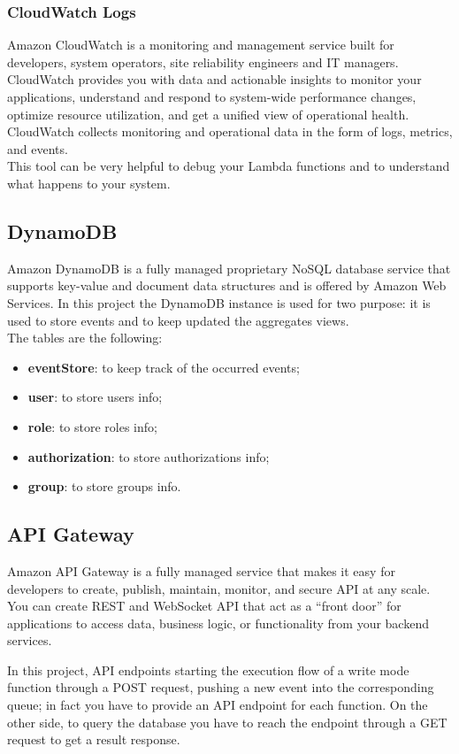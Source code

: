 \subsubsection{CloudWatch Logs}
Amazon CloudWatch is a monitoring and management service built for developers, system operators, site reliability engineers and IT managers. CloudWatch provides you with data and actionable insights to monitor your applications, understand and respond to system-wide performance changes, optimize resource utilization, and get a unified view of operational health. CloudWatch collects monitoring and operational data in the form of logs, metrics, and events. \\
This tool can be very helpful to debug your Lambda functions and to understand what happens to your system.

\subsection{DynamoDB}
Amazon DynamoDB is a fully managed proprietary NoSQL database service that supports key-value and document data structures and is offered by Amazon Web Services.
In this project the DynamoDB instance is used for two purpose: it is used to store events and to keep updated the aggregates views.\\
The tables are the following:
\begin{itemize}
	\item \textbf{eventStore}: to keep track of the occurred events;
	\item \textbf{user}: to store users info;
	\item \textbf{role}: to store roles info;
	\item \textbf{authorization}: to store authorizations info;
	\item \textbf{group}: to store groups info.
\end{itemize}

\subsection{API Gateway}
Amazon API Gateway is a fully managed service that makes it easy for developers to create, publish, maintain, monitor, and secure API at any scale. You can create REST and WebSocket API that act as a “front door” for applications to access data, business logic, or functionality from your backend services.

In this project, API endpoints starting the execution flow of a write mode function through a POST request, pushing a new event into the corresponding queue; in fact you have to provide an API endpoint for each function. On the other side, to query the database you have to reach the endpoint through a GET request to get a result response.

